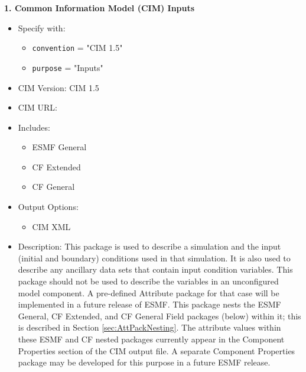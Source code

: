 \vspace{.20in}

{\bf 1. Common Information Model (CIM) Inputs}

\begin{itemize}
    \item Specify with:
    \begin{itemize}
        \item {\tt convention} = "CIM 1.5"
        \item {\tt purpose} = "Inputs"
    \end{itemize}
    \item CIM Version: CIM 1.5
    \item CIM URL: 
    \item Includes:
    \begin{itemize}
        \item ESMF General
        \item CF Extended
        \item CF General
    \end{itemize}
    \item Output Options:
    \begin{itemize}
        \item CIM XML
    \end{itemize}
    \item Description: This package is used to describe a simulation and the input (initial and boundary) conditions used in that simulation. It is also used to describe any ancillary data sets that contain input condition variables. This package should not be used to describe the variables in an unconfigured model component. A pre-defined Attribute package for that case will be implemented in a future release of ESMF.  This package nests the ESMF General, CF Extended, and CF General Field packages (below) within it; this is described in Section \ref{sec:AttPackNesting}.  The attribute values within these ESMF and CF nested packages currently appear in the Component Properties section of the CIM output file.  A separate Component Properties package may be developed for this purpose in a future ESMF release.
\end{itemize}

